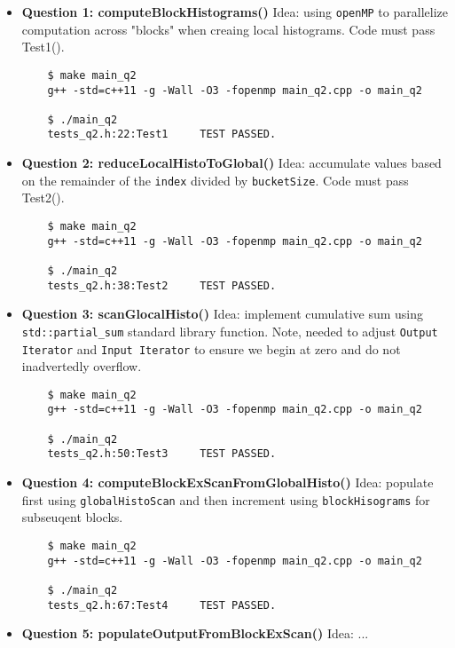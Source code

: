 \documentclass[12pt,letterpaper,twoside]{article}
\begin{document}
\begin{itemize}
    \item \textbf{Question 1: computeBlockHistograms()} Idea: using \texttt{openMP}
    to parallelize computation across "blocks" when creaing local histograms.
    Code must pass Test1().

    \begin{verbatim}
    $ make main_q2
    g++ -std=c++11 -g -Wall -O3 -fopenmp main_q2.cpp -o main_q2

    $ ./main_q2
    tests_q2.h:22:Test1     TEST PASSED.
    \end{verbatim}

    \item \textbf{Question 2: reduceLocalHistoToGlobal()} Idea: accumulate values 
    based on the remainder of the \texttt{index} divided by \texttt{bucketSize}.
    Code must pass Test2().

    \begin{verbatim}
    $ make main_q2
    g++ -std=c++11 -g -Wall -O3 -fopenmp main_q2.cpp -o main_q2

    $ ./main_q2
    tests_q2.h:38:Test2     TEST PASSED.
    \end{verbatim}

    \item \textbf{Question 3: scanGlocalHisto()} Idea: implement cumulative sum 
    using \texttt{std::partial\_sum} standard library function. Note, needed to 
    adjust \texttt{Output Iterator} and \texttt{Input Iterator} to ensure we 
    begin at zero and do not inadvertedly overflow.

    \begin{verbatim}
    $ make main_q2
    g++ -std=c++11 -g -Wall -O3 -fopenmp main_q2.cpp -o main_q2

    $ ./main_q2
    tests_q2.h:50:Test3     TEST PASSED.
    \end{verbatim}

    \item \textbf{Question 4: computeBlockExScanFromGlobalHisto()} Idea: populate first
    using \texttt{globalHistoScan} and then increment using \texttt{blockHisograms}
    for subseuqent blocks. 
    
    \begin{verbatim}
    $ make main_q2
    g++ -std=c++11 -g -Wall -O3 -fopenmp main_q2.cpp -o main_q2

    $ ./main_q2
    tests_q2.h:67:Test4     TEST PASSED.
    \end{verbatim}

    \item \textbf{Question 5: populateOutputFromBlockExScan()} Idea: ...

\end{itemize}
\end{document}
